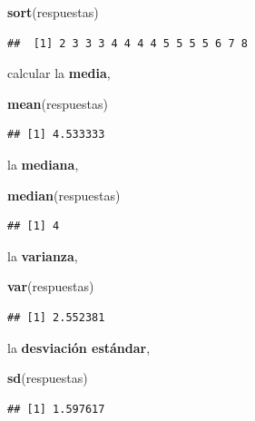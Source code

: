 \documentclass[
]{book}
\newenvironment{Shaded}{\begin{snugshade}}{\end{snugshade}}
\newcommand{\FunctionTok}[1]{\textcolor[rgb]{0.13,0.29,0.53}{\textbf{#1}}}
\newcommand{\NormalTok}[1]{#1}
\begin{document}
\begin{Shaded}
\begin{Highlighting}[]
\FunctionTok{sort}\NormalTok{(respuestas)}
\end{Highlighting}
\end{Shaded}

\begin{verbatim}
##  [1] 2 3 3 3 4 4 4 4 5 5 5 5 6 7 8
\end{verbatim}

calcular la \textbf{media},

\begin{Shaded}
\begin{Highlighting}[]
\FunctionTok{mean}\NormalTok{(respuestas)}
\end{Highlighting}
\end{Shaded}

\begin{verbatim}
## [1] 4.533333
\end{verbatim}

la \textbf{mediana},

\begin{Shaded}
\begin{Highlighting}[]
\FunctionTok{median}\NormalTok{(respuestas)}
\end{Highlighting}
\end{Shaded}

\begin{verbatim}
## [1] 4
\end{verbatim}

la \textbf{varianza},

\begin{Shaded}
\begin{Highlighting}[]
\FunctionTok{var}\NormalTok{(respuestas)}
\end{Highlighting}
\end{Shaded}

\begin{verbatim}
## [1] 2.552381
\end{verbatim}

la \textbf{desviación estándar},

\begin{Shaded}
\begin{Highlighting}[]
\FunctionTok{sd}\NormalTok{(respuestas)}
\end{Highlighting}
\end{Shaded}

\begin{verbatim}
## [1] 1.597617
\end{verbatim}
\end{document}
